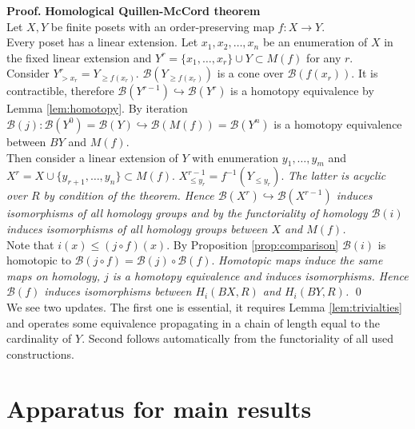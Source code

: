 \documentclass[english,12pt]{article}
\numberwithin{equation}{section}
\theoremstyle{definition}
\theoremstyle{remark}
\newenvironment{pf}{\noindent\textbf{Proof.}}{\qed}
\renewcommand{\leq}{\leqslant}
\renewcommand{\geq}{\geqslant}
\begin{document}
\begin{pf} \textbf{Homological Quillen-McCord theorem}\\
Let $X, Y$ be finite posets with an order-preserving map $f : X \to Y$.\\

Every poset has a linear extension. Let $x_1, x_2, \ldots, x_n$ be an enumeration of $X$ in the fixed linear extension and $Y^r = \{x_1,\ldots,x_r\} \cup Y \subset M(f)$ for any $r$.\\

Consider $Y^r_{>x_r} = Y_{\geq f(x_r)}$. $\mathcal{B}(Y_{\geq f(x_r)})$ is a cone over $\mathcal{B}(f(x_r))$. It is contractible, therefore $\mathcal{B}(Y^{r-1}) \hookrightarrow \mathcal{B}(Y^{r})$ is a homotopy equivalence by Lemma \ref{lem:homotopy}. By iteration $\mathcal{B}(j) : \mathcal{B}(Y^{0}) = \mathcal{B}(Y) \hookrightarrow \mathcal{B}(M(f)) = \mathcal{B}(Y^n)$ is a homotopy equivalence between $BY$ and $M(f)$.\\

Then consider a linear extension of $Y$ with enumeration $y_1,\ldots,y_m$ and $X^r = X \cup \{y_{r+1},\ldots,y_n\} \subset M(f)$. $X^{r-1}_{\leq y_r} = f^{-1}(Y_{\leqslant y_r})$. \textit{The latter is acyclic over $R$ by condition of the theorem. Hence $\mathcal{B}(X^{r}) \hookrightarrow \mathcal{B}(X^{r-1})$ induces isomorphisms of all homology groups and by the functoriality of homology $\mathcal{B}(i)$ induces isomorphisms of all homology groups between $X$ and $M(f)$.}\\

Note that $i(x) \leqslant (j \circ f)(x)$. By Proposition \ref{prop:comparison} $\mathcal{B}(i)$ is homotopic to $\mathcal{B}(j \circ f) = \mathcal{B}(j) \circ \mathcal{B}(f)$. \textit{Homotopic maps induce the same maps on homology, $j$ is a homotopy equivalence and induces isomorphisms. Hence $\mathcal{B}(f)$ induces isomorphisms between $H_i(BX,R)$ and $H_i(BY,R)$.}
\end{pf}\\

We see two updates. The first one is essential, it requires Lemma \ref{lem:trivialties} and operates some equivalence propagating in a chain of length equal to the cardinality of $Y$. Second follows automatically from the functoriality of all used constructions.

\section{Apparatus for main results}
\end{document}
